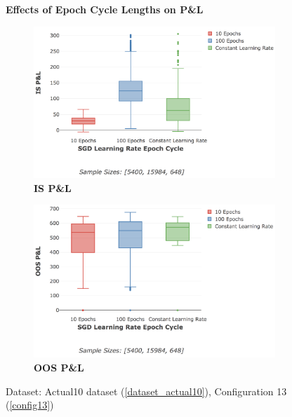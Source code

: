 \documentclass[a4paper,11pt,oneside]{article}
\theoremstyle{plain}
\theoremstyle{definition}
\begin{document}
		
	\begin{figure}[H]
		\centering
		\textbf{Effects of Epoch Cycle Lengths on P\&L}
		\begin{subfigure}{.46\textwidth}
			\centering 
			\includegraphics[scale=0.33]{images/results/8_6_complexity/IS_actual_pl_lr_epochs.png}
			\caption{\textbf{IS P\&L} 
				\newline }
			\label{figure-actual_is_pl_lr_epochs}
		\end{subfigure}%
		\begin{subfigure}{.48\textwidth}
			\centering 
			\includegraphics[scale=0.32]{images/results/8_6_complexity/OOS_actual_pl_lr_epochs.png}
			\caption{\textbf{OOS P\&L} 
				\newline }
			\label{figure-actual_oos_pl_lr_epochs}
		\end{subfigure}
		\caption[Effects of Epoch Cycle Lengths on P\&L]
		{Dataset: Actual10 dataset (\ref{dataset_actual10}), Configuration 13 (\ref{config13})
}
\end{figure}
\end{document}
